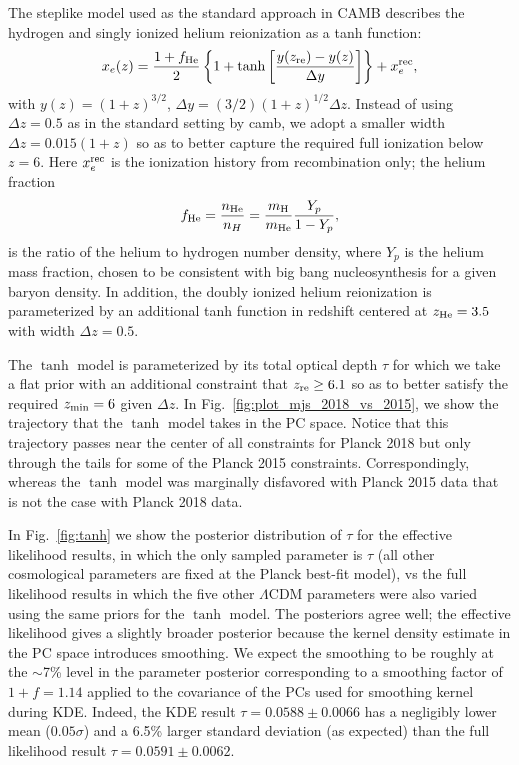 \documentclass[prd,twocolumn,amsmath,amssymb,floatfix,superscriptaddress,nofootinbib]{revtex4-1}
\newcommand{\reffig}[1]{Fig.~\ref{fig:#1}}
\newcommand{\zre}{z_{\rm re}}
\newcommand{\beq}{\begin{equation}}
\newcommand{\eeq}{\end{equation}}
\begin{document}
The steplike model used as the standard approach in CAMB describes the hydrogen and singly ionized helium reionization as a tanh function:
%
 \begin{equation}
x_e(z) = \frac{1+f_{\rm He}}{2}\left\{  1+ \tanh\left[ \frac{y(z_{\rm re})-y(z)}{\Delta y} \right] \right\} + x_e^{\rm rec},
 \label{eqn:tanh_1D}
 \end{equation}
 with $y(z)=(1+z)^{3/2}$, $\Delta y=(3/2)(1+z)^{1/2}\Delta z$. Instead of using $\Delta z = 0.5$ as in the standard setting by camb, we adopt a smaller width $\Delta z = 0.015(1+z)$ so as to better capture the required full ionization below $z=6$. Here $x_e^{\rm rec}$ is the ionization history from recombination only; the helium fraction
 \beq
 f_{\rm He} = \frac{n_{\rm He}}{n_{H}} = \frac{m_{\rm H}}{m_{\rm He}} \frac{Y_p}{1 - Y_p}, 
 \eeq
 is the ratio of the helium to hydrogen number density, where $Y_p$ is the helium mass fraction, chosen to be consistent with big bang nucleosynthesis for a given baryon density. In addition, the doubly ionized helium reionization is parameterized by an additional tanh function in redshift centered at $z_{\rm He} = 3.5$ with width $\Delta z = 0.5$.

The $\tanh$ model is parameterized by its total optical depth $\tau$ for which we take a flat prior 
with an additional constraint that $z_{\rm re}\ge 6.1$ so as to better satisfy the required $z_{\rm min}=6$ given $\Delta z$.
In Fig.~\ref{fig:plot_mjs_2018_vs_2015}, we show the trajectory that the $\tanh$ model takes in the PC space. Notice that this trajectory passes near the center of all constraints for Planck 2018 but only through the tails for some of the Planck 2015 constraints.  Correspondingly, whereas the $\tanh$ model was marginally disfavored with Planck 2015 data that is not the case with Planck 2018 data. 

In \reffig{tanh} we show the posterior distribution of $\tau$ for the effective likelihood results, in which the only sampled parameter is $\tau$ (all other cosmological parameters are fixed at the Planck best-fit model), vs the full likelihood results in which the five other $\Lambda$CDM parameters were also varied using the same priors for the $\tanh$ model.
The posteriors agree well; the effective likelihood gives a slightly broader posterior because the kernel density estimate in the PC space introduces smoothing. We expect the smoothing to be roughly at the $\sim$7\% level in the parameter posterior corresponding to a smoothing factor of $1+f = 1.14$ applied to the covariance of the PCs used for smoothing kernel during KDE. Indeed, the KDE result $\tau = 0.0588 \pm 0.0066$ has a negligibly lower mean ($0.05\sigma$) and a 6.5\% larger standard deviation (as expected) than the full likelihood result $\tau = 0.0591 \pm 0.0062$.
\end{document}
